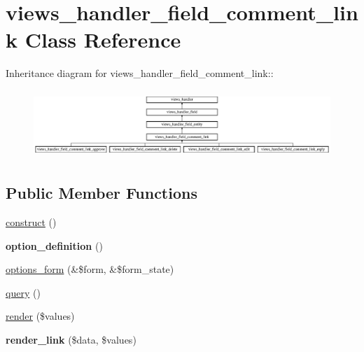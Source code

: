 \hypertarget{classviews__handler__field__comment__link}{
\section{views\_\-handler\_\-field\_\-comment\_\-link Class Reference}
\label{classviews__handler__field__comment__link}
}
Inheritance diagram for views\_\-handler\_\-field\_\-comment\_\-link::\begin{figure}[H]
\begin{center}
\leavevmode
\includegraphics[height=2.60223cm]{classviews__handler__field__comment__link}
\end{center}
\end{figure}
\subsection*{Public Member Functions}
\begin{DoxyCompactItemize}
\item 
\hyperlink{classviews__handler__field__comment__link_a11c7fcae5ff5f91fa48fc1581115869b}{construct} ()
\item 
\hypertarget{classviews__handler__field__comment__link_a9f066947db597494928b57423b1b7d30}{
{\bfseries option\_\-definition} ()}
\label{classviews__handler__field__comment__link_a9f066947db597494928b57423b1b7d30}

\item 
\hyperlink{classviews__handler__field__comment__link_a82957426a30584198c79c78804265bdc}{options\_\-form} (\&\$form, \&\$form\_\-state)
\item 
\hyperlink{classviews__handler__field__comment__link_ac19c2cedce77bfa9490624df9cd1eac2}{query} ()
\item 
\hyperlink{classviews__handler__field__comment__link_ac5e8317cc1a0b2a7688f865662b27dae}{render} (\$values)
\item 
\hypertarget{classviews__handler__field__comment__link_aa2a112d27a6e20fc129a5faa65c6f637}{
{\bfseries render\_\-link} (\$data, \$values)}
\label{classviews__handler__field__comment__link_aa2a112d27a6e20fc129a5faa65c6f637}

\end{DoxyCompactItemize}


